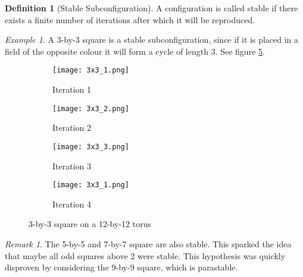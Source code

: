 \documentclass[12pt]{article}
\theoremstyle{definition}
\newtheorem{definition}{Definition}%
\theoremstyle{remark}
\newtheorem{remark}{Remark}%
\theoremstyle{remark}
\newtheorem{example}{Example}%
\begin{document}
\begin{definition}[Stable Subconfiguration]
A configuration is called stable if there exists a finite number of iterations after which it will be reproduced. 
\end{definition}
\begin{example}
A 3-by-3 square is a stable subconfiguration, since if it is placed in a field of the opposite colour it will form a cycle of length 3. See figure \ref{StableConfigs}.

\begin{figure}
  \centering
  \begin{subfigure}[b]{0.2\linewidth}
    \texttt{[image: 3x3\_1.png]}
    \caption{Iteration 1}
    \label{fig:3x3_1}
  \end{subfigure}
  \begin{subfigure}[b]{0.2\linewidth}
    \texttt{[image: 3x3\_2.png]}
    \caption{Iteration 2}
    \label{fig:3x3_2}
  \end{subfigure}
  \begin{subfigure}[b]{0.2\linewidth}
    \texttt{[image: 3x3\_3.png]}
    \caption{Iteration 3}
    \label{fig:3x3_3}
  \end{subfigure}
  \begin{subfigure}[b]{0.2\linewidth}
    \texttt{[image: 3x3\_1.png]}
    \caption{Iteration 4}
    \label{fig:3x3_4}
  \end{subfigure}
  \caption{3-by-3 square on a 12-by-12 torus}
  \label{StableConfigs}
\end{figure}




\end{example}
\begin{remark}
The 5-by-5 and 7-by-7 square are also stable. This sparked the idea that maybe all odd squares above 2 were stable. This hypothesis was quickly disproven by considering the 9-by-9 square, which is parastable.
\end{remark}
\end{document}
